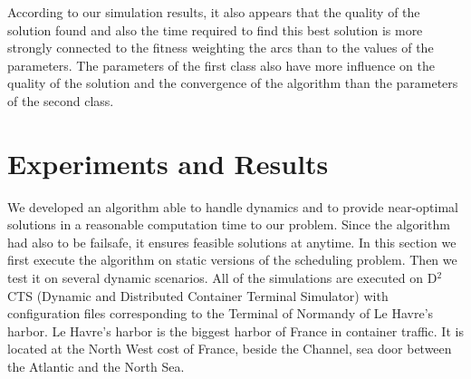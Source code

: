 \documentclass[a4paper,10pt]{article}
\begin{document}
According to our simulation results, it also appears that the quality of the solution found and also the time required to find this best solution is more strongly connected to the fitness weighting the arcs than to the values of the parameters. The parameters of the first class also have more influence on the quality of the solution and the convergence of the algorithm than the parameters of the second class.

\section{Experiments and Results}\label{sec:expe}
   We developed an algorithm able to handle dynamics and to provide near-optimal solutions in a reasonable computation time to our problem. Since the algorithm had also to be failsafe, it ensures feasible solutions at anytime. In this section we first execute the algorithm on static versions of the scheduling problem. Then we test it on several dynamic scenarios.
   All of the simulations are executed on D$^2$CTS (Dynamic and Distributed Container Terminal Simulator)\cite{Lesauvage2011} with configuration files corresponding to the Terminal of Normandy of Le Havre's harbor. Le Havre’s harbor is the biggest harbor of France in container traffic. It is located at the North West cost of France, beside the Channel, sea door between the Atlantic and the North Sea.

\end{document}
